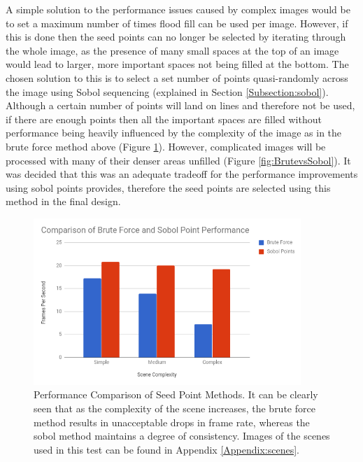 A simple solution to the performance issues caused by complex images would be to set a maximum number of times flood fill can be used per image. However, if this is done then the seed points can no longer be selected by iterating through the whole image, as the presence of many small spaces at the top of an image would lead to larger, more important spaces not being filled at the bottom. The chosen solution to this is to select a set number of points quasi-randomly across the image using Sobol sequencing (explained in Section \ref{Subsection:sobol}). Although a certain number of points will land on lines and therefore not be used, if there are enough points then all the important spaces are filled without performance being heavily influenced by the complexity of the image as in the brute force method above (Figure \ref{fig:fpscomp}). However, complicated images will be processed with many of their denser areas unfilled (Figure \ref{fig:BrutevsSobol}). It was decided that this was an adequate tradeoff for the performance improvements using sobol points provides, therefore the seed points are selected using this method in the final design.

\begin{figure}[H]
    \begin{center}
      \includegraphics[width=0.9\textwidth]{Figures/FPSComp.png}
      \caption[Performance Comparison of Seed Point Methods]{Performance Comparison of Seed Point Methods. It can be clearly seen that as the complexity of the scene increases, the brute force method results in unacceptable drops in frame rate, whereas the sobol method maintains a degree of consistency. Images of the scenes used in this test can be found in Appendix \ref{Appendix:scenes}.}
      \label{fig:fpscomp}
    \end{center}
\end{figure}

